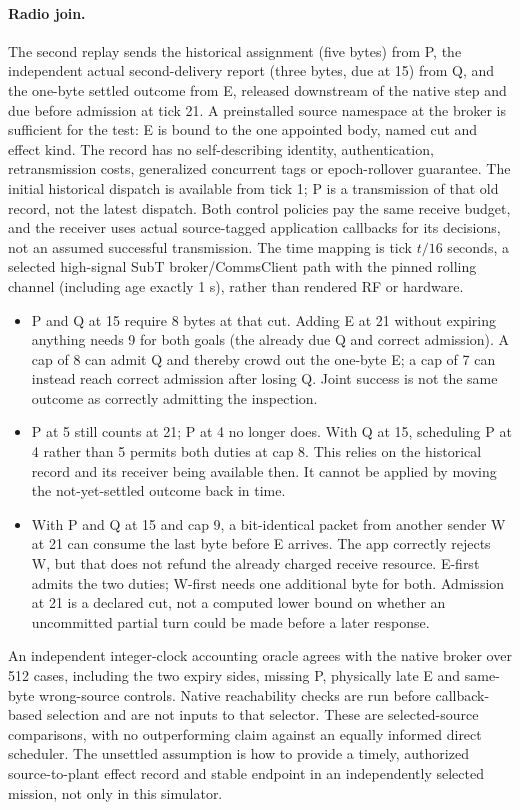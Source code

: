 \documentclass{article}
\begin{document}
\paragraph{Radio join.}
The second replay sends the historical assignment (five bytes) from P, the
independent actual second-delivery report (three bytes, due at 15) from Q, and
the one-byte settled outcome from E, released downstream of the native
step and due before admission at tick 21. A preinstalled source namespace at
the broker is sufficient for the test: E is bound to the one appointed body,
named cut and effect kind. The record has no self-describing identity,
authentication, retransmission costs, generalized concurrent tags or epoch-rollover
guarantee. The initial historical dispatch is available from tick 1;
P is a transmission of that old record, not the latest dispatch.
Both control policies pay the same receive budget, and the receiver uses actual
source-tagged application callbacks for its decisions, not an assumed successful
transmission. The time mapping is tick $t/16$ seconds, a selected high-signal
SubT broker/CommsClient path with the pinned rolling channel (including age
exactly 1 s), rather than rendered RF or hardware.
\begin{itemize}
\item P and Q at 15 require 8 bytes at that cut. Adding E at 21 without
expiring anything needs 9 for both goals (the already due Q and correct
admission). A cap of 8 can admit Q and thereby crowd out the one-byte E; a
cap of 7 can instead reach correct admission after losing Q. Joint success is
not the same outcome as correctly admitting the inspection.
\item P at 5 still counts at 21; P at 4 no longer does. With Q at 15,
scheduling P at 4 rather than 5 permits both duties at cap 8. This relies on
the historical record and its receiver being available then. It cannot be
applied by moving the not-yet-settled outcome back in time.
\item With P and Q at 15 and cap 9, a bit-identical packet from another
sender W at 21 can consume the last byte before E arrives. The app correctly
rejects W, but that does not refund the already charged receive resource.
E-first admits the two duties; W-first needs one additional byte for both.
Admission at 21 is a declared cut, not a computed lower bound on whether an
uncommitted partial turn could be made before a later response.
\end{itemize}
An independent integer-clock accounting oracle agrees with the native broker
over 512 cases, including the two expiry sides, missing P, physically late E
and same-byte wrong-source controls. Native reachability checks are run before
callback-based selection and are not inputs to that selector. These are
selected-source comparisons, with no outperforming claim against an equally
informed direct scheduler. The unsettled assumption is how to provide a timely,
authorized source-to-plant effect record and stable endpoint in an independently
selected mission, not only in this simulator.
\end{document}
